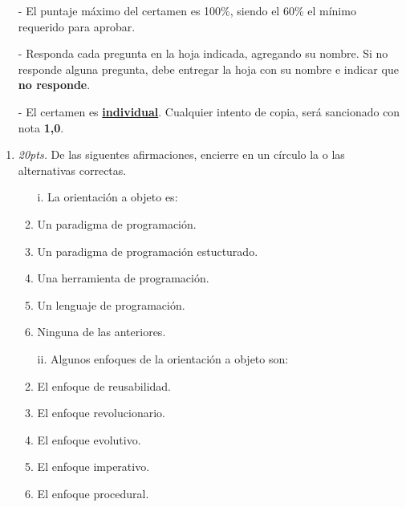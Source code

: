 \documentclass[10pt]{article}
\begin{document}
{\scriptsize
\begin{itemize}
    \item[-] El puntaje m\'aximo del certamen es 100\%, siendo el 60\% el m\'inimo requerido para aprobar.
    \item[-] Responda cada pregunta en la hoja indicada, agregando su nombre. Si no responde alguna pregunta, debe entregar la hoja con su nombre e indicar que \textbf{no responde}.
    \item[-] El certamen es \underline{\textbf{individual}}. Cualquier intento de copia, ser\'a sancionado con nota \textbf{1,0}.
\end{itemize}
\vspace*{10pt}

\vspace*{-30pt}

\begin{enumerate}

    \item \emph{20pts.} De las siguentes afirmaciones, encierre en un c\'irculo la o las alternativas correctas.
    \begin{multicols}{2}

    \begin{enumerate}[label=(\alph*)]
        \item[i.] La orientaci\'on a objeto es: 
        \item Un paradigma de programaci\'on.
        \item Un paradigma de programaci\'on estucturado.
        \item Una herramienta de programaci\'on.
        \item Un lenguaje de programaci\'on.
        \item Ninguna de las anteriores.
    \end{enumerate}

    \begin{enumerate}[label=(\alph*)]
        \item[ii.] Algunos enfoques de la orientaci\'on a objeto son:
        \item El enfoque de reusabilidad.
        \item El enfoque revolucionario.
        \item El enfoque evolutivo.
        \item El enfoque imperativo.
        \item El enfoque procedural.
    \end{enumerate}


\end{multicols}
\end{enumerate}}
\end{document}

